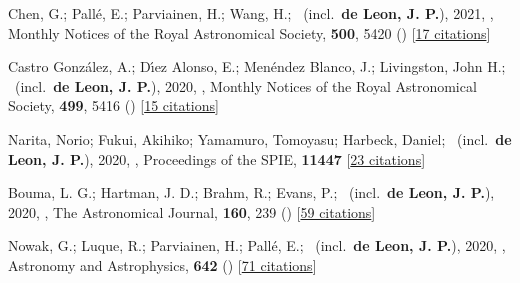 \item[{\color{numcolor}\scriptsize32}] Chen, G.; Pall{\'e}, E.; Parviainen, H.; Wang, H.; \etal\ (incl.\ \textbf{de Leon, J. P.}), 2021, , Monthly Notices of the Royal Astronomical Society, \textbf{500}, 5420 () [\href{https://ui.adsabs.harvard.edu/abs/2021MNRAS.500.5420C}{17 citations}]

\item[{\color{numcolor}\scriptsize31}] Castro Gonz{\'a}lez, A.; D{\'\i}ez Alonso, E.; Men{\'e}ndez Blanco, J.; Livingston, John H.; \etal\ (incl.\ \textbf{de Leon, J. P.}), 2020, , Monthly Notices of the Royal Astronomical Society, \textbf{499}, 5416 () [\href{https://ui.adsabs.harvard.edu/abs/2020MNRAS.499.5416C}{15 citations}]

\item[{\color{numcolor}\scriptsize30}] Narita, Norio; Fukui, Akihiko; Yamamuro, Tomoyasu; Harbeck, Daniel; \etal\ (incl.\ \textbf{de Leon, J. P.}), 2020, , Proceedings of the SPIE, \textbf{11447} [\href{https://www.spiedigitallibrary.org/conference-proceedings-of-spie/10925/1092507/Focus-adjustable-motion-blur-compensation-method-using-deformable-mirror/10.1117/12.2509567.short}{23 citations}]

\item[{\color{numcolor}\scriptsize29}] Bouma, L. G.; Hartman, J. D.; Brahm, R.; Evans, P.; \etal\ (incl.\ \textbf{de Leon, J. P.}), 2020, , The Astronomical Journal, \textbf{160}, 239 () [\href{https://ui.adsabs.harvard.edu/abs/2020AJ....160..239B}{59 citations}]

\item[{\color{numcolor}\scriptsize28}] Nowak, G.; Luque, R.; Parviainen, H.; Pall{\'e}, E.; \etal\ (incl.\ \textbf{de Leon, J. P.}), 2020, , Astronomy and Astrophysics, \textbf{642} () [\href{https://ui.adsabs.harvard.edu/abs/2020A&A...642A.173N}{71 citations}]

